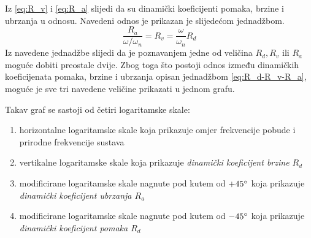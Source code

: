 
Iz \eqref{eq:R_v} i \eqref{eq:R_a} slijedi da su dinamički koeficijenti pomaka,
brzine i ubrzanja u odnosu. Navedeni odnos je prikazan je slijedećom jednadžbom.
\begin{equation}\label{eq:R_d-R_v-R_a}
    \frac{R_a}{\omega/\omega_n}=R_v=\frac{\omega}{\omega_n}R_d 
\end{equation}
Iz navedene jednadžbe slijedi da je poznavanjem jedne od veličina $R_d, R_v 
\text{ ili } R_a$ moguće dobiti preostale dvije. Zbog toga što postoji odnos
između dinamičkih koeficijenata pomaka, brzine i ubrzanja opisan jednadžbom 
\eqref{eq:R_d-R_v-R_a}, moguće je sve tri navedene veličine prikazati u jednom
grafu.

Takav graf se sastoji od četiri logaritamske skale:
\begin{enumerate}
    \item horizontalne logaritamske skale koja prikazuje omjer frekvencije pobude i 
        prirodne frekvencije sustava 
    \item vertikalne logaritamske skale koja prikazuje \textit{dinamički koeficijent brzine
        $R_d$}
    \item modificirane logaritamske skale nagnute pod kutem od $+45\degree$ koja prikazuje
        \textit{dinamički koeficijent ubrzanja $R_a$}
    \item modificirane logaritamske skale nagnute pod kutem od $-45\degree$ koja prikazuje
        \textit{dinamički koeficijent pomaka $R_d$}
\end{enumerate}


